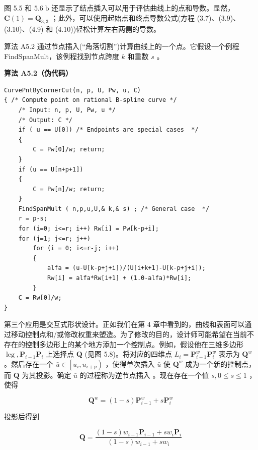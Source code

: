 \documentclass[../main.tex]{subfiles}
\begin{document}
图 5.5 和 \({5.6}\mathrm{\;b}\) 还显示了结点插入可以用于评估曲线上的点和导数。显然， \(\mathbf{C}\left( 1\right)  = {\mathbf{Q}}_{3,3}\) ；此外，可以使用起始点和终点导数公式(方程 (3.7)、(3.9)、(3.10)、(4.9) 和 (4.10))轻松计算左右两侧的导数。

算法 A5.2 通过节点插入(“角落切割”)计算曲线上的一个点。它假设一个例程 FindSpanMult，该例程找到节点跨度 \(k\) 和重数 \(s\) 。





\par\medskip\noindent\textbf{算法 A5.2（伪代码）}\par
\begin{verbatim}
CurvePntByCornerCut(n, p, U, Pw, u, C)
{ /* Compute point on rational B-spline curve */
    /* Input: n, p, U, Pw, u */
    /* Output: C */
    if ( u == U[0]) /* Endpoints are special cases  */
    {
        C = Pw[0]/w; return;
    }
    if (u == U[n+p+1])
    {
        C = Pw[n]/w; return;
    }
    FindSpanMult ( n,p,u,U,& k,& s) ; /* General case  */
    r = p-s;
    for (i=0; i<=r; i++) Rw[i] = Pw[k-p+i];
    for (j=1; j<=r; j++)
        for (i = 0; i<=r-j; i++)
        {
            alfa = (u-U[k-p+j+i])/(U[i+k+1]-U[k-p+j+i]);
            Rw[i] = alfa*Rw[i+1] + (1.0-alfa)*Rw[i];
        }
    C = Rw[0]/w;
}
\end{verbatim}

第三个应用是交互式形状设计。正如我们在第 4 章中看到的，曲线和表面可以通过移动控制点和/或修改权重来塑造。为了修改的目的，设计师可能希望在当前不存在的控制多边形上的某个地方添加一个控制点。例如，假设他在三维多边形 \(\operatorname{leg},{\mathbf{P}}_{i - 1}{\mathbf{P}}_{i}\) 上选择点 \(\mathbf{Q}\) (见图 5.8)。将对应的四维点 \({L}_{i} = {\mathbf{P}}_{i - 1}^{w}{\mathbf{P}}_{i}^{w}\) 表示为 \({\mathbf{Q}}^{w}\) 。然后存在一个 \(\bar{u} \in  \left\lbrack  {{u}_{i},{u}_{i + p}}\right)\) ，使得单次插入 \(\bar{u}\) 使 \({\mathbf{Q}}^{w}\) 成为一个新的控制点，而 \(\mathbf{Q}\) 为其投影。确定 \(\bar{u}\) 的过程称为逆节点插入 \cite{Pieg89c}。现在存在一个值 \(s,0 \leq  s \leq  1\) ，使得

\[
{\mathbf{Q}}^{w} = \left( {1 - s}\right) {\mathbf{P}}_{i - 1}^{w} + s{\mathbf{P}}_{i}^{w}
\]

投影后得到

\[
\mathbf{Q} = \frac{\left( {1 - s}\right) {w}_{i - 1}{\mathbf{P}}_{i - 1} + s{w}_{i}{\mathbf{P}}_{i}}{\left( {1 - s}\right) {w}_{i - 1} + s{w}_{i}} \tag{5.19}
\]
\end{document}
